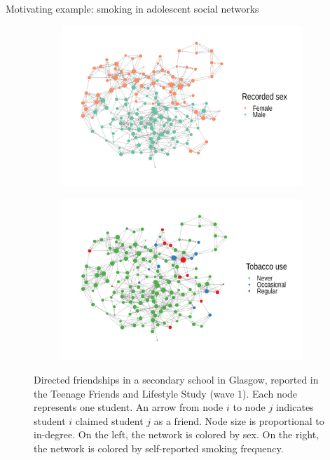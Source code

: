 \documentclass[final]{beamer}
\newlength{\colwidth}
\begin{document}
\begin{frame}[t]
\begin{columns}[t]
\begin{column}{\colwidth}
\begin{block}{Motivating example: smoking in adolescent social networks}
    \begin{figure}[ht!]
      \begin{subfigure}{0.49\textwidth}
          \centering
          \includegraphics[width=\textwidth]{figures/glasgow/sex.png}
      \end{subfigure}
      \begin{subfigure}{0.49\textwidth}
          \centering
          \includegraphics[width=\textwidth]{figures/glasgow/tobacco.png}
      \end{subfigure}
      \caption{Directed friendships in a secondary school in Glasgow, reported in the Teenage Friends and Lifestyle Study (wave 1). Each node represents one student. An arrow from node $i$ to node $j$ indicates student $i$ claimed student $j$ as a friend. Node size is proportional to in-degree. On the left, the network is colored by sex. On the right, the network is colored by self-reported smoking frequency.}
      \label{fig:glasgow}
  \end{figure}
  

\end{block}
\end{column}
\end{columns}
\end{frame}
\end{document}
